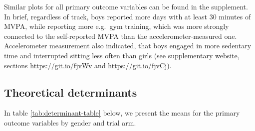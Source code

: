 \documentclass[british,man]{apa6}
\begin{document}
Similar plots for all primary outcome variables can be found in the supplement. In brief, regardless of track, boys reported more days with at least 30 minutes of MVPA, while reporting more e.g.~gym training, which was more strongly connected to the self-reported MVPA than the accelerometer-measured one. Accelerometer measurement also indicated, that boys engaged in more sedentary time and interrupted sitting less often than girls (see supplementary website, sections \url{https://git.io/fjvWv} and \url{https://git.io/fjvCj}).

\hypertarget{theoretical-determinants}{%
\subsection{Theoretical determinants}\label{theoretical-determinants}}

In table \ref{tab:determinant-table} below, we present the means for the primary outcome variables by gender and trial arm.
\end{document}
